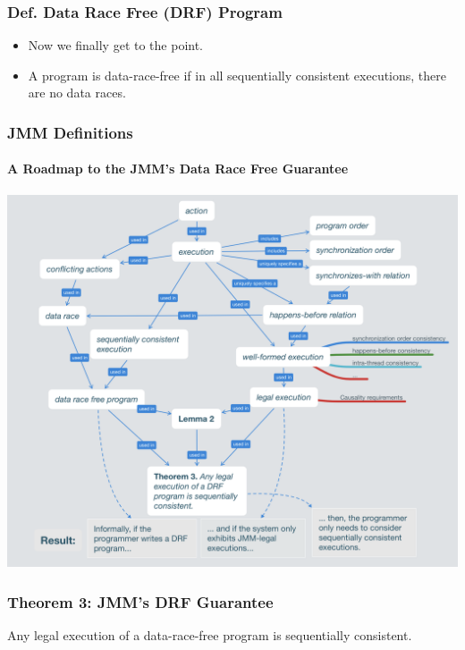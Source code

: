 \begin{frame}
    \frametitle{\textbf{Def.} Data Race Free (DRF) Program}

    \begin{itemize}
    \item Now we finally get to the point.

    \item A program is data-race-free if in all sequentially consistent
          executions, there are no data races.
    \end{itemize}
\end{frame}

\begin{frame}
    \frametitle{JMM Definitions}
    \framesubtitle{A Roadmap to the JMM's Data Race Free Guarantee}
    \centering
    \includegraphics[width=\textwidth,height=0.85\textheight,keepaspectratio]{jmm_definitions_overview.png}
\end{frame}

\begin{frame}
    \frametitle{Theorem 3: JMM's DRF Guarantee}

    \centering
    \Large
    Any legal execution of a data-race-free program is sequentially consistent.
\end{frame}